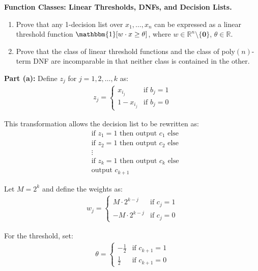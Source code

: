 \documentclass[11pt]{article}
\newcommand*{\R}{\mathbb{R}}
\DeclareMathOperator{\1}{\mathbbm{1}}
\begin{document}
\begin{problem} [15 points] \textbf{Function Classes: Linear Thresholds, DNFs, and Decision Lists.} \
	\begin{enumerate}[label=\alph*)]
		\item Prove that any 1-decision list over $x_1,\dots,x_n$ can be expressed as a linear threshold function $\1[w \cdot x \geq \theta]$, where $w \in \R^n\setminus\{\mathbf{0}\}$, $\theta \in \R$.
		\item Prove that the class of linear threshold functions and the class of
		poly$(n)$-term DNF are incomparable in that neither class is contained in the
		other.
	\end{enumerate}

\textbf{Part (a):} Define $z_j$ for $j=1,2,\dots,k$ as:
\begin{align}
	z_j = 
	\begin{cases}
	x_{i_j} & \text{if } b_j = 1 \\
	1 - x_{i_j} & \text{if } b_j = 0
	\end{cases}
	\end{align}

This transformation allows the decision list to be rewritten as:
\begin{align}
	&\text{if } z_1 = 1 \text{ then output } c_1 \text{ else} \\
	&\text{if } z_2 = 1 \text{ then output } c_2 \text{ else} \\
	&\vdots \\
	&\text{if } z_k = 1 \text{ then output } c_k \text{ else} \\
	&\text{output } c_{k+1}
	\end{align}

Let $M=2^k$ and define the weights as:
\begin{align}
	w_j = 
	\begin{cases}
	M \cdot 2^{k-j} & \text{if } c_j = 1 \\
	-M \cdot 2^{k-j} & \text{if } c_j = 0
	\end{cases}
	\end{align}

For the threshold, set: 
\begin{align}
	\theta = 
	\begin{cases}
	-\frac{1}{2} & \text{if } c_{k+1} = 1 \\
	\frac{1}{2} & \text{if } c_{k+1} = 0
	\end{cases}
	\end{align}


\end{problem}
\end{document}
